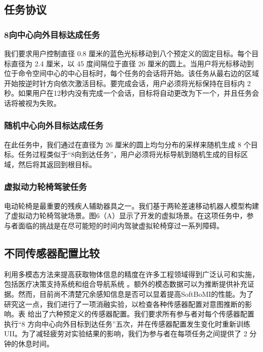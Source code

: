   \subsection{任务协议  }   
    \subsubsection{8向中心向外目标达成任务  }    我们要求用户控制直径 0.8 厘米的蓝色光标移动到八个预定义的固定目标。每个目标直径为 2.4 厘米，以 45 度间隔位于直径 26 厘米的圆上。当用户将光标移动到位于命令空间中心的中心目标时，每个任务的会话将开始。该任务从最右边的区域开始按逆时针方向依次激活目标。要完成会话，用户必须将光标保持在目标内 2 秒。如果用户在12秒内没有完成一个会话，目标将自动更改为下一个，并且任务会话将被视为失败。  

   \subsubsection{随机中心向外目标达成任务  }    在此任务中，我们通过在直径为 26 厘米的圆上均匀分布的采样来随机生成 8 个目标。任务过程类似于“8向到达任务”，用户必须将光标导航到随机生成的目标区域，然后将其返回到根目标。  

   \subsubsection{虚拟动力轮椅驾驶任务  }    电动轮椅是最重要的残疾人辅助器具之一。我们基于两轮差速移动机器人模型构建了虚拟动力轮椅驾驶场景。图6（A）显示了开发的虚拟场景。在这项任务中，参与者面临的挑战是在尽可能短的时间内驾驶虚拟轮椅穿过一系列障碍。  

   \subsection{不同传感器配置比较  }    利用多模态方法来提高获取物体信息的精度在许多工程领域得到广泛认可和实施，包括医疗决策支持系统和组合导航系统    \cite{williamsonContinuousUncertainInteraction2006}    。额外的模态数据可以为推断提供补充证据。然而，目前尚不清楚冗余感知信息是否可以显着提高SoftBoMI的性能。为了研究这一点，我们进行了一项消融实验，以检查各种传感器配置对意图推断的影响。表    \uppercase       \expandafter{}    给出了六种预定义的传感器配置。我们要求所有参与者对每个传感器配置执行“8 方向中心向外目标到达任务”五次，并在传感器配置发生变化时重新训练 UII。为了减轻疲劳对实验结果的影响，我们为参与者在每项任务之间提供了 2 分钟的休息时间。  


